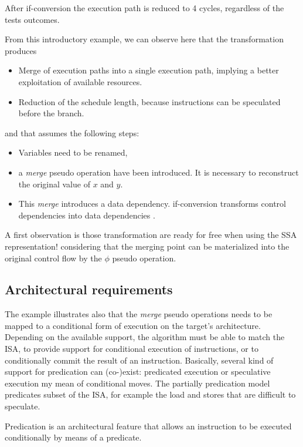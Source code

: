 After if-conversion the execution path is reduced to 4 cycles, regardless of the tests outcomes. 

From this introductory example, we can observe here that the transformation produces
\begin{itemize}
\item Merge of execution paths into a single execution path, implying a  better exploitation of available resources.  
\item Reduction of the schedule length, because instructions can be speculated before the branch.
\end{itemize}

and that assumes the following steps:

\begin{itemize}
\item Variables need to be renamed, 
\item a \textit{merge} pseudo operation have been introduced. It is necessary to reconstruct the original value of $x$ and $y$.
\item This \textit{merge} introduces a data dependency. if-conversion transforms control dependencies into data dependencies \cite{Allen:1983:CCD:567067.567085}. 
\end{itemize}

A first observation is those transformation are ready for free when using the SSA representation! considering that the merging point can be materialized into the original control flow by the $\phi$ pseudo operation.

\subsection{Architectural requirements}
The example illustrates also that the \textit{merge} pseudo operations needs to be mapped to a conditional form of execution on the target's architecture. Depending on the available support, the algorithm must be able to match the ISA, to provide support for conditional execution of instructions, or to conditionally commit the result of an instruction.
Basically, several kind of support for predication can (co-)exist: predicated execution  or speculative execution my mean of conditional moves. The partially predication model predicates subset of the ISA, for example the load and stores that are difficult to speculate.

Predication is an architectural feature that allows an instruction to be executed conditionally by means of a predicate.

